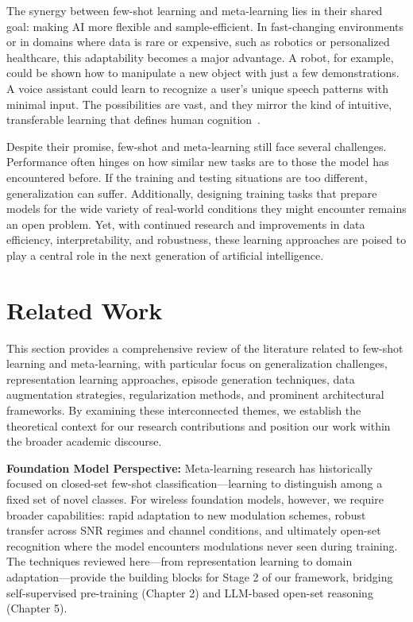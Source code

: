The synergy between few-shot learning and meta-learning lies in their shared goal: making AI more flexible and sample-efficient. In fast-changing environments or in domains where data is rare or expensive, such as robotics or personalized healthcare, this adaptability becomes a major advantage. A robot, for example, could be shown how to manipulate a new object with just a few demonstrations. A voice assistant could learn to recognize a user’s unique speech patterns with minimal input. The possibilities are vast, and they mirror the kind of intuitive, transferable learning that defines human cognition~\cite{snell2017prototypical}.

Despite their promise, few-shot and meta-learning still face several challenges. Performance often hinges on how similar new tasks are to those the model has encountered before. If the training and testing situations are too different, generalization can suffer. Additionally, designing training tasks that prepare models for the wide variety of real-world conditions they might encounter remains an open problem. Yet, with continued research and improvements in data efficiency, interpretability, and robustness, these learning approaches are poised to play a central role in the next generation of artificial intelligence.


\section{Related Work} 

This section provides a comprehensive review of the literature related to few-shot learning and meta-learning, with particular focus on generalization challenges, representation learning approaches, episode generation techniques, data augmentation strategies, regularization methods, and prominent architectural frameworks. By examining these interconnected themes, we establish the theoretical context for our research contributions and position our work within the broader academic discourse.

\textbf{Foundation Model Perspective:} Meta-learning research has historically focused on closed-set few-shot classification—learning to distinguish among a fixed set of novel classes. For wireless foundation models, however, we require broader capabilities: rapid adaptation to new modulation schemes, robust transfer across SNR regimes and channel conditions, and ultimately open-set recognition where the model encounters modulations never seen during training. The techniques reviewed here—from representation learning to domain adaptation—provide the building blocks for Stage 2 of our framework, bridging self-supervised pre-training (Chapter 2) and LLM-based open-set reasoning (Chapter 5).

